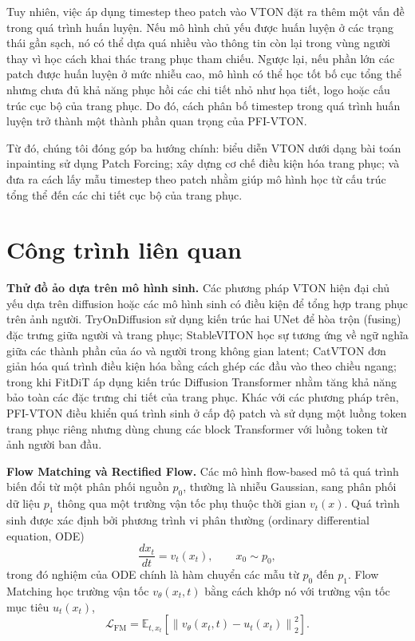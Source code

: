 \documentclass[11pt,a4paper]{article}
\begin{document}
Tuy nhiên, việc áp dụng timestep theo patch vào VTON đặt ra thêm một vấn đề trong quá trình huấn luyện. Nếu mô hình chủ yếu được huấn luyện ở các trạng thái gần sạch, nó có thể dựa quá nhiều vào thông tin còn lại trong vùng người thay vì học cách khai thác trang phục tham chiếu. Ngược lại, nếu phần lớn các patch được huấn luyện ở mức nhiễu cao, mô hình có thể học tốt bố cục tổng thể nhưng chưa đủ khả năng phục hồi các chi tiết nhỏ như họa tiết, logo hoặc cấu trúc cục bộ của trang phục. Do đó, cách phân bố timestep trong quá trình huấn luyện trở thành một thành phần quan trọng của PFI-VTON.

Từ đó, chúng tôi đóng góp ba hướng chính: biểu diễn VTON dưới dạng bài toán inpainting sử dụng Patch Forcing; xây dựng cơ chế điều kiện hóa trang phục; và đưa ra cách lấy mẫu timestep theo patch nhằm giúp mô hình học từ cấu trúc tổng thể đến các chi tiết cục bộ của trang phục.


\section{Công trình liên quan}

\textbf{Thử đồ ảo dựa trên mô hình sinh.}
Các phương pháp VTON hiện đại chủ yếu dựa trên diffusion hoặc các mô hình sinh có điều kiện để tổng hợp trang phục trên ảnh người. TryOnDiffusion \cite{tryon} sử dụng kiến trúc hai UNet để hòa trộn (fusing) đặc trưng giữa người và trang phục; StableVITON \cite{stableviton} học sự tương ứng về ngữ nghĩa giữa các thành phần của áo và người trong không gian latent; CatVTON \cite{catvton} đơn giản hóa quá trình điều kiện hóa bằng cách ghép các đầu vào theo chiều ngang; trong khi FitDiT \cite{fitdit} áp dụng kiến trúc Diffusion Transformer nhằm tăng khả năng bảo toàn các đặc trưng chi tiết của trang phục. Khác với các phương pháp trên, PFI-VTON điều khiển quá trình sinh ở cấp độ patch và sử dụng một luồng token trang phục riêng nhưng dùng chung các block Transformer với luồng token từ ảnh người ban đầu.

\textbf{Flow Matching và Rectified Flow.}
Các mô hình flow-based mô tả quá trình biến đổi từ một phân phối nguồn \(p_0\), thường là nhiễu Gaussian, sang phân phối dữ liệu \(p_1\) thông qua một trường vận tốc phụ thuộc thời gian \(v_t(x)\). Quá trình sinh được xác định bởi phương trình vi phân thường (ordinary differential equation, ODE)
\begin{equation}
\frac{d x_t}{dt}=v_t(x_t), \qquad x_0\sim p_0,
\end{equation}
trong đó nghiệm của ODE chính là hàm chuyển các mẫu từ \(p_0\) đến \(p_1\). Flow Matching \cite{flowmatching} học trường vận tốc \(v_\theta(x_t,t)\) bằng cách khớp nó với trường vận tốc mục tiêu \(u_t(x_t)\),
\begin{equation}
\mathcal{L}_{\mathrm{FM}} = \mathbb{E}_{t,x_t} \left[ \left\| v_\theta(x_t,t)-u_t(x_t) \right\|_2^2 \right].
\end{equation}
\end{document}
